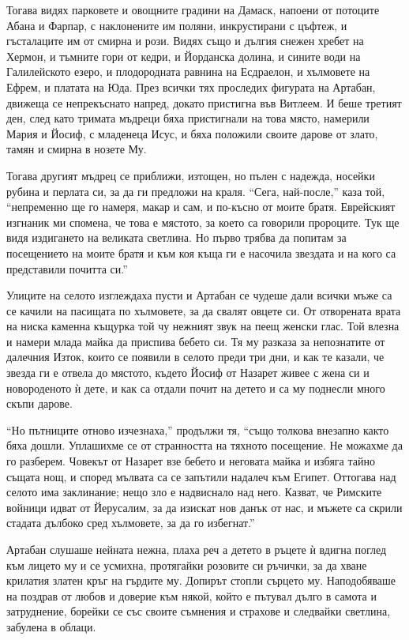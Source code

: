 \documentclass[oneside,10pt]{memoir}
\begin{document}
Тогава видях парковете и овощните градини на Дамаск, напоени от потоците Абана и
Фарпар, с наклонените им поляни, инкрустирани с цъфтеж, и гъсталаците им от
смирна и рози. Видях също и дългия снежен хребет на Хермон, и тъмните гори от
кедри, и Йорданска долина, и сините води на Галилейското езеро, и плодородната
равнина на Есдраелон, и хълмовете на Ефрем, и платата на Юда. През всички тях
проследих фигурата на Артабан, движеща се непрекъснато напред, докато пристигна
във Витлеем. И беше третият ден, след като тримата мъдреци бяха пристигнали на
това място, намерили Мария и Йосиф, с младенеца Исус, и бяха положили своите
дарове от злато, тамян и смирна в нозете Му.

Тогава другият мъдрец се приближи, изтощен, но пълен с надежда, носейки рубина и
перлата си, за да ги предложи на краля. ``Сега, най-после,'' каза той,
``непременно ще го намеря, макар и сам, и по-късно от моите братя. Еврейският
изгнаник ми спомена, че това е мястото, за което са говорили пророците. Тук ще
видя издигането на великата светлина. Но първо трябва да попитам за посещението
на моите братя и към коя къща ги е насочила звездата и на кого са представили
почитта си.''

Улиците на селото изглеждаха пусти и Артабан се чудеше дали всички мъже са се
качили на пасищата по хълмовете, за да свалят овцете си. От отворената врата на
ниска каменна къщурка той чу нежният звук на пеещ женски глас. Той влезна и
намери млада майка да приспива бебето си. Тя му разказа за непознатите от
далечния Изток, които се появили в селото преди три дни, и как те казали, че
звезда ги е отвела до мястото, където Йосиф от Назарет живее с жена си и
новороденото ѝ дете, и как са отдали почит на детето и са му поднесли много
скъпи дарове.

``Но пътниците отново изчезнаха,'' продължи тя, ``също толкова внезапно както
бяха дошли. Уплашихме се от странността на тяхното посещение. Не можахме да го
разберем. Човекът от Назарет взе бебето и неговата майка и избяга тайно същата
нощ, и според мълвата са се запътили надалеч към Египет. Оттогава над селото има
заклинание; нещо зло е надвиснало над него. Казват, че Римските войници идват от
Йерусалим, за да изискат нов данък от нас, и мъжете са скрили стадата дълбоко
сред хълмовете, за да го избегнат.''

Артабан слушаше нейната нежна, плаха реч а детето в ръцете ѝ вдигна поглед към
лицето му и се усмихна, протягайки розовите си ръчички, за да хване крилатия
златен кръг на гърдите му. Допирът стопли сърцето му. Наподобяваше на поздрав от
любов и доверие към някой, който е пътувал дълго в самота и затруднение, борейки
се със своите съмнения и страхове и следвайки светлина, забулена в облаци.
\end{document}
